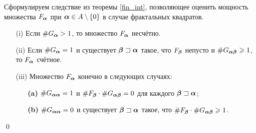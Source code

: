 Сформулируем следствие из теоремы \ref{fin_int}, позволяющее оценить мощность множества $F_{\bm{\alpha}}$ при ${\bm{\alpha}}\in A\setminus\{0\}$ в случае фрактальных квадратов.

\begin{corollary}\label{fin_int_sq}
\qquad
\begin{itemize}[nolistsep]
 \item[(i)] Если $\#G_{{\bm{\alpha}}}> 1$, то множество $F_{\bm{\alpha}}$ несчётно.
 \item[(ii)] Если $\#G_{{\bm{\alpha}}}=1$ и существует ${\bm{\beta}}\sqsupset{\bm{\alpha}}$ такое, что  $F_{\bm{\beta}}$ непусто и $\#G_{{\bm{\alpha}}{\bm{\beta}}}\geqslant1$, то $F_{\bm{\alpha}}$ счётное.
 \item[(iii)] Множество $F_{\bm{\alpha}}$ конечно в следующих случаях:
 \begin{itemize}[nolistsep]
 \item[\textbf{(a)}] $\#G_{{\bm{\alpha}}{\bm{\alpha}}}=1$ и $\#F_{\bm{\beta}}\cdot\#G_{{\bm{\alpha}}{\bm{\beta}}}=0$ для каждого ${\bm{\beta}}\sqsupset{\bm{\alpha}}$;
 \item[\textbf{(b)}] $\#G_{{\bm{\alpha}}{\bm{\alpha}}}=0$ и существует ${\bm{\beta}}\sqsupset{\bm{\alpha}}$ такое, что $\#F_{\bm{\beta}}\cdot\#G_{{\bm{\alpha}}{\bm{\beta}}}\geqslant1$.
 \end{itemize}
\end{itemize}\qed 
\end{corollary}

